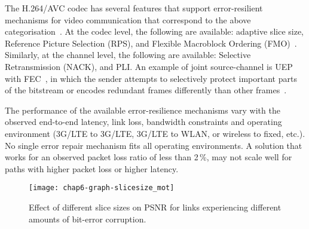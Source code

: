 The H.264/AVC codec has several features that support error-resilient
mechanisms for video communication that correspond to the above
categorisation~\cite{310669}. At the codec level, the following are available:
adaptive slice size, Reference Picture Selection (RPS), and Flexible
Macroblock Ordering (FMO)~\cite{err_res_h264_std, wenger_ott_jscc}. Similarly,
at the channel level, the following are available: Selective Retransmission
(NACK), and PLI. An example of joint source-channel is UEP with 
FEC~\cite{wang00review}, in which the sender
attempts to selectively protect important parts of the bitstream or 
encodes redundant frames differently than other frames~\cite{ervcuupkp}.

The performance of the available error-resilience mechanisms vary with the
observed end-to-end latency, link loss, bandwidth constraints and operating
environment (3G/LTE to 3G/LTE, 3G/LTE to WLAN, or wireless to fixed, etc.). No
single error repair mechanism fits all operating environments. A solution that
works for an observed packet loss ratio of less than 2\,\%, may not scale well
for paths with higher packet loss or higher latency.


\begin{figure}
\centerline {
\texttt{[image: chap6-graph-slicesize\_mot]}
}
\caption{Effect of different slice sizes on PSNR for links experiencing different amounts of bit-error corruption.}
\label{fig:slicesize_mot}
\end{figure}

